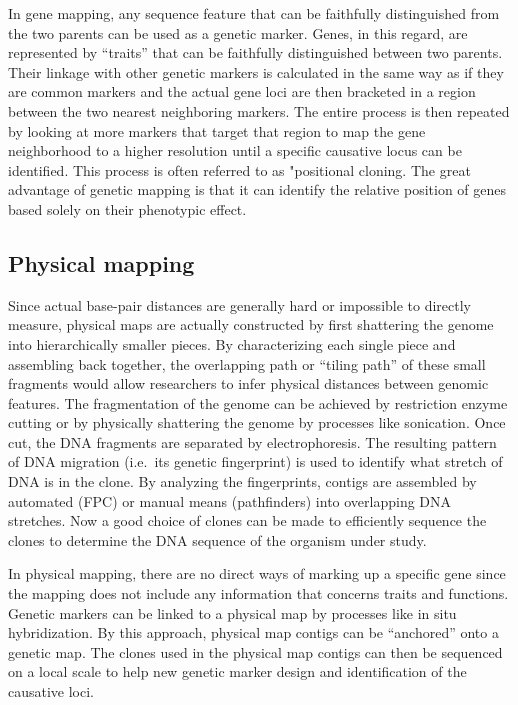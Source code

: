 In gene mapping, any sequence feature that can be faithfully distinguished from the two parents can be used as a genetic marker. Genes, in this regard, are represented by ``traits'' that can be faithfully distinguished between two parents. Their linkage with other genetic markers is calculated in the same way as if they are common markers and the actual gene loci are then bracketed in a region between the two nearest neighboring markers. The entire process is then repeated by looking at more markers that target that region to map the gene neighborhood to a higher resolution until a specific causative locus can be identified. This process is often referred to as "positional cloning. The great advantage of genetic mapping is that it can identify the relative position of genes based solely on their phenotypic effect.

\hypertarget{physical-mapping}{%
\subsection{Physical mapping}\label{physical-mapping}}

Since actual base-pair distances are generally hard or impossible to directly measure, physical maps are actually constructed by first shattering the genome into hierarchically smaller pieces. By characterizing each single piece and assembling back together, the overlapping path or ``tiling path'' of these small fragments would allow researchers to infer physical distances between genomic features. The fragmentation of the genome can be achieved by restriction enzyme cutting or by physically shattering the genome by processes like sonication. Once cut, the DNA fragments are separated by electrophoresis. The resulting pattern of DNA migration (i.e.~its genetic fingerprint) is used to identify what stretch of DNA is in the clone. By analyzing the fingerprints, contigs are assembled by automated (FPC) or manual means (pathfinders) into overlapping DNA stretches. Now a good choice of clones can be made to efficiently sequence the clones to determine the DNA sequence of the organism under study.

In physical mapping, there are no direct ways of marking up a specific gene since the mapping does not include any information that concerns traits and functions. Genetic markers can be linked to a physical map by processes like in situ hybridization. By this approach, physical map contigs can be ``anchored'' onto a genetic map. The clones used in the physical map contigs can then be sequenced on a local scale to help new genetic marker design and identification of the causative loci.

